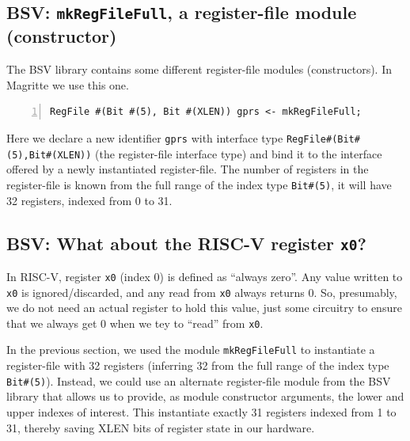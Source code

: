 
\subsection{BSV: {\tt mkRegFileFull}, a register-file module (constructor)}


The BSV library contains some different register-file modules
(constructors). In Magritte we use this one.


\begin{Verbatim}[frame=single, numbers=left]
   RegFile #(Bit #(5), Bit #(XLEN)) gprs <- mkRegFileFull;
\end{Verbatim}

Here we declare a new identifier \verb|gprs| with interface type
\verb|RegFile#(Bit#(5),Bit#(XLEN))| (the register-file interface type)
and bind it to the interface offered by a newly instantiated
register-file.  The number of registers in the register-file is known
from the full range of the index type \verb|Bit#(5)|, {\ie} it will
have 32 registers, indexed from 0 to 31.


\subsection{BSV: What about the RISC-V register {\tt x0}?}


In RISC-V, register \verb|x0| (index 0) is defined as ``always zero''.
Any value written to \verb|x0| is ignored/discarded, and any read from
\verb|x0| always returns 0.  So, presumably, we do not need an actual
register to hold this value, just some circuitry to ensure that we
always get 0 when we tey to ``read'' from \verb|x0|.

In the previous section, we used the module \verb|mkRegFileFull| to
instantiate a register-file with 32 registers (inferring 32 from the
full range of the index type \verb|Bit#(5)|).  Instead, we could use
an alternate register-file module from the BSV library that allows us
to provide, as module constructor arguments, the lower and upper
indexes of interest.  This instantiate exactly 31 registers indexed
from 1 to 31, thereby saving XLEN bits of register state in our
hardware.


